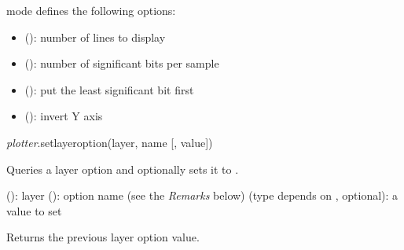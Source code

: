 \documentclass[a4paper,12pt,twoside,extrafontsizes]{memoir}
\begin{document}
\begin{funcremarks}
	 mode defines the following options:
	
	\begin{itemize}
		\item {} (): number of lines to display
		\item {} (): number of significant bits per sample
		\item {} (): put the least significant bit first
		\item {} (): invert Y axis
	\end{itemize}
\end{funcremarks}


\begin{luafuncprototype}
\emph{plotter}.setlayeroption(layer, name [, value])
\end{luafuncprototype}

\begin{funcdescr}
	Queries a layer option  and optionally sets it to .
\end{funcdescr}

\begin{funcparams}
	 (): layer
	 (): option name (see the \emph{Remarks} below)
	 (type depends on , optional): a value to set
\end{funcparams}

\begin{funcret}
	Returns the previous layer option value.
\end{funcret}
\end{document}
